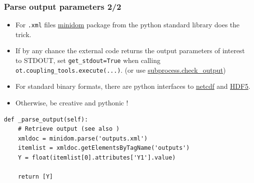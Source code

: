 \documentclass[10pt, aspectratio=169]{beamer}
\begin{document}
\begin{frame}[fragile]
\frametitle{Parse output parameters 2/2}
\begin{itemize}
\item For \texttt{.xml} files \href{https://docs.python.org/2/library/xml.dom.minidom.html}{minidom} package from the python standard library does the trick.
\item If by any chance the external code returns the output parameters of
  interest to STDOUT, set \texttt{get\_stdout=True} when calling
  \texttt{ot.coupling\_tools.execute(...)}.  (or use \href{https://docs.python.org/2/library/subprocess.html#subprocess.check_output}{subprocess.check\_output})
\item For standard binary formats, there are python interfaces to \href{https://github.com/Unidata/netcdf4-python}{netcdf}
  and \href{http://www.h5py.org/}{HDF5}.
\item Otherwise, be creative and pythonic !
\end{itemize}
\begin{Verbatim}[xleftmargin=10mm]
def _parse_output(self):
    # Retrieve output (see also )
    xmldoc = minidom.parse('outputs.xml')
    itemlist = xmldoc.getElementsByTagName('outputs')
    Y = float(itemlist[0].attributes['Y1'].value)

    return [Y]
\end{Verbatim}
\end{frame}
\end{document}

